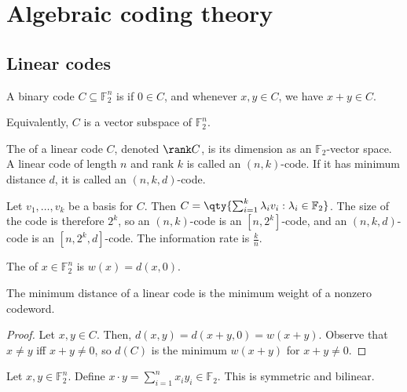 \section{Algebraic coding theory}

\subsection{Linear codes}

\begin{definition}
    A binary code $C \subseteq \mathbb F_2^n$ is  if $0 \in C$, and whenever $x, y \in C$, we have $x + y \in C$.
\end{definition}

Equivalently, $C$ is a vector subspace of $\mathbb F_2^n$.

\begin{definition}[Rank]
    The  of a linear code $C$, denoted $\rank C$, is its dimension as an $\mathbb F_2$-vector space.
    A linear code of length $n$ and rank $k$ is called an $(n,k)$-code.
    If it has minimum distance $d$, it is called an $(n,k,d)$-code.
\end{definition}

Let $v_1, \dots, v_k$ be a basis for $C$.
Then $C = \qty{\sum_{i=1}^k \lambda_i v_i : \lambda_i \in \mathbb F_2}$.
The size of the code is therefore $2^k$, so an $(n,k)$-code is an $[n,2^k]$-code, and an $(n,k,d)$-code is an $[n,2^k,d]$-code.
The information rate is $\frac{k}{n}$.

\begin{definition}[Weight]
    The  of $x \in \mathbb F_2^n$ is $w(x) = d(x,0)$.
\end{definition}

\begin{lemma}
    The minimum distance of a linear code is the minimum weight of a nonzero codeword.
\end{lemma}

\begin{proof}
    Let $x, y \in C$.
    Then, $d(x,y) = d(x+y,0) = w(x+y)$.
    Observe that $x \neq y$ iff $x + y \neq 0$, so $d(C)$ is the minimum $w(x+y)$ for $x + y \neq 0$.
\end{proof}

\begin{definition}
    Let $x, y \in \mathbb F_2^n$.
    Define $x \cdot y = \sum_{i=1}^n x_i y_i \in \mathbb F_2$.
    This is symmetric and bilinear.
\end{definition}

